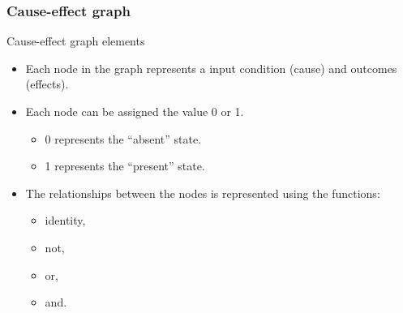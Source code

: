 \begin{frame}
\frametitle{Cause-effect graph}

\begin{block:fact}{Cause-effect graph elements}
\begin{itemize}
	\item Each node in the graph represents a input condition (cause) and
	outcomes (effects).

	\item Each node can be assigned the value 0 or 1.
	\begin{itemize}
		\item 0 represents the ``absent'' state.
		\item 1 represents the ``present'' state.
	\end{itemize}

	\item The relationships between the nodes is represented using the
	functions:
	\begin{itemize}
		\item identity,
		\item not,
		\item or,
		\item and.
	\end{itemize}
\end{itemize}
\end{block:fact}
\end{frame}


